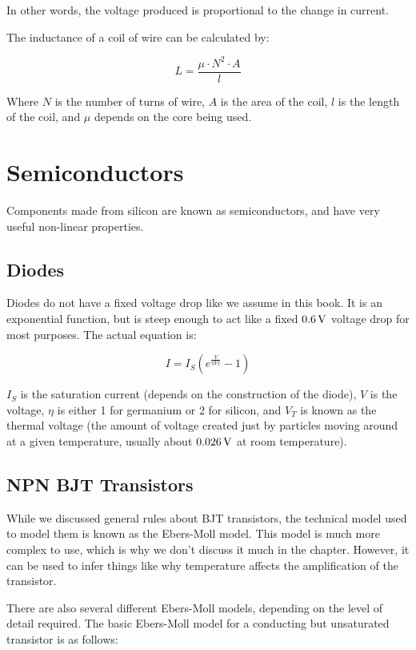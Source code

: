 In other words, the voltage produced is proportional to the change in current.

The inductance of a coil of wire can be calculated by:

\begin{equation}
L = \frac{\mu \cdot N^2 \cdot A}{l}
\end{equation}

Where $N$ is the number of turns of wire, $A$ is the area of the coil, $l$ is the length of the coil, and $\mu$ depends on the core being used.

\section{Semiconductors}

Components made from silicon are known as semiconductors, and have very useful non-linear properties.

\subsection{Diodes}

Diodes do not have a fixed voltage drop like we assume in this book.  
It is an exponential function, but is steep enough to act like a fixed $0.6\,\si{\volt}$ voltage drop for most purposes.
The actual equation is:

\begin{equation}
I = I_S (e^{\frac{V}{\eta V_T}} - 1)
\end{equation}

$I_S$ is the saturation current (depends on the construction of the diode), $V$ is the voltage, $\eta$ is either 1 for germanium or 2 for silicon, and $V_T$ is known as the thermal voltage (the amount of voltage created just by particles moving around at a given temperature, usually about $0.026\,\si{\volt}$ at room temperature).

\subsection{NPN BJT Transistors}

While we discussed general rules about BJT transistors, the technical model used to model them is known as the Ebers-Moll model.
This model is much more complex to use, which is why we don't discuss it much in the chapter.
However, it can be used to infer things like why temperature affects the amplification of the transistor.

There are also several different Ebers-Moll models, depending on the level of detail required.
The basic Ebers-Moll model for a conducting but unsaturated transistor is as follows:

